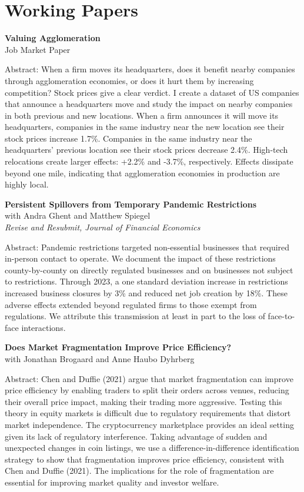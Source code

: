 \documentclass[11pt]{article}
\begin{document}
\section*{Working Papers}
\textbf{Valuing Agglomeration}\\
Job Market Paper

Abstract: When a firm moves its headquarters, does it benefit nearby companies through agglomeration economies, or does it hurt them by increasing competition? Stock prices give a clear verdict. I create a dataset of US companies that announce a headquarters move and study the impact on nearby companies in both previous and new locations. When a firm announces it will move its headquarters, companies in the same industry near the new location see their stock prices increase 1.7\%. Companies in the same industry near the headquarters' previous location see their stock prices decrease 2.4\%. High-tech relocations create larger effects: +2.2\% and -3.7\%, respectively. Effects dissipate beyond one mile, indicating that agglomeration economies in production are highly local.

\textbf{Persistent Spillovers from Temporary Pandemic Restrictions}\\
with Andra Ghent and Matthew Spiegel\\
\emph{Revise and Resubmit, Journal of Financial Economics}

Abstract: Pandemic restrictions targeted non-essential businesses that required in-person contact to operate. We document the impact of these restrictions county-by-county on directly regulated businesses and on businesses not subject to restrictions. Through 2023, a one standard deviation increase in restrictions increased business closures by 3\% and reduced net job creation by 18\%. These adverse effects extended beyond regulated firms to those exempt from regulations. We attribute this transmission at least in part to the loss of face-to-face interactions.

\textbf{Does Market Fragmentation Improve Price Efficiency?}\\
with Jonathan Brogaard and Anne Haubo Dyhrberg

Abstract: Chen and Duffie (2021) argue that market fragmentation can improve price efficiency by enabling traders to split their orders across venues, reducing their overall price impact, making their trading more aggressive. Testing this theory in equity markets is difficult due to regulatory requirements that distort market independence. The cryptocurrency marketplace provides an ideal setting given its lack of regulatory interference. Taking advantage of sudden and unexpected changes in coin listings, we use a difference-in-difference identification strategy to show that fragmentation improves price efficiency, consistent with Chen and Duffie (2021). The implications for the role of fragmentation are essential for improving market quality and investor welfare.
\end{document}
